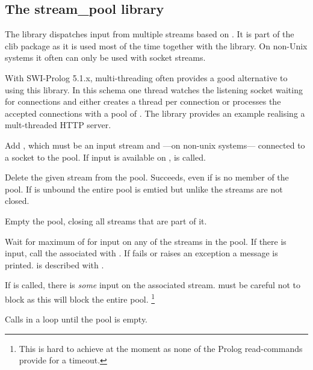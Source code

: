 \documentclass[11pt]{article}
\begin{document}
\subsection{The stream_pool library}

The  library dispatches input from multiple streams
based on .  It is part of the clib package as it is used
most of the time together with the  library.  On non-Unix
systems it often can only be used with socket streams.

With SWI-Prolog 5.1.x, multi-threading often provides a good alternative
to using this library. In this schema one thread watches the listening
socket waiting for connections and either creates a thread per
connection or processes the accepted connections with a pool of
. The library  provides
an example realising a mult-threaded HTTP server.

\begin{description}
Add , which must be an input stream and ---on non-unix
systems--- connected to a socket to the pool.  If input is available
on ,  is called.

Delete the given stream from the pool.  Succeeds, even if 
is no member of the pool.  If  is unbound the entire pool
is emtied but unlike  the streams are not closed.

Empty the pool, closing all streams that are part of it.

Wait for maximum of  for input on any of the streams in
the pool.  If there is input, call the  associated with
.  If  fails or raises an exception a
message is printed.   is described with .

If  is called, there is \emph{some} input on the associated
stream.   must be careful not to block as this will block
the entire pool.%
    \footnote{This is hard to achieve at the moment as none of the
	      Prolog read-commands provide for a timeout.}

Calls  in a loop until the pool is empty.
\end{description}
\end{document}
